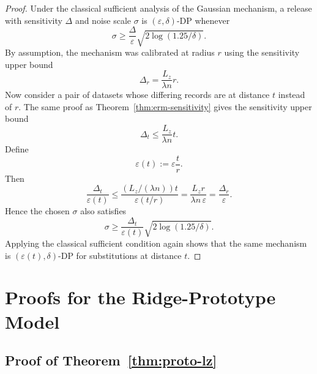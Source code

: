 \documentclass[11pt,a4paper]{report}
\theoremstyle{plain}
\theoremstyle{definition}
\theoremstyle{remark}
\begin{document}
\begin{proof}
Under the classical sufficient analysis of the Gaussian mechanism, a release with sensitivity $\Delta$ and noise scale $\sigma$ is $(\varepsilon,\delta)$-DP whenever
\[
\sigma\ge \frac{\Delta}{\varepsilon}\sqrt{2\log(1.25/\delta)}.
\]
By assumption, the mechanism was calibrated at radius $r$ using the sensitivity upper bound
\[
\Delta_r=\frac{L_z}{\lambda n}r.
\]
Now consider a pair of datasets whose differing records are at distance $t$ instead of $r$. The same proof as Theorem~\ref{thm:erm-sensitivity} gives the sensitivity upper bound
\[
\Delta_t\le \frac{L_z}{\lambda n}t.
\]
Define
\[
\varepsilon(t):=\varepsilon\frac{t}{r}.
\]
Then
\[
\frac{\Delta_t}{\varepsilon(t)}
\le
\frac{(L_z/(\lambda n))t}{\varepsilon(t/r)}
=
\frac{L_z r}{\lambda n\,\varepsilon}
=
\frac{\Delta_r}{\varepsilon}.
\]
Hence the chosen $\sigma$ also satisfies
\[
\sigma\ge \frac{\Delta_t}{\varepsilon(t)}\sqrt{2\log(1.25/\delta)}.
\]
Applying the classical sufficient condition again shows that the same mechanism is $(\varepsilon(t),\delta)$-DP for substitutions at distance $t$.
\end{proof}

\section{Proofs for the Ridge-Prototype Model}
\label{app:proof-ridge}

\subsection{Proof of Theorem~\ref{thm:proto-lz}}
\end{document}
